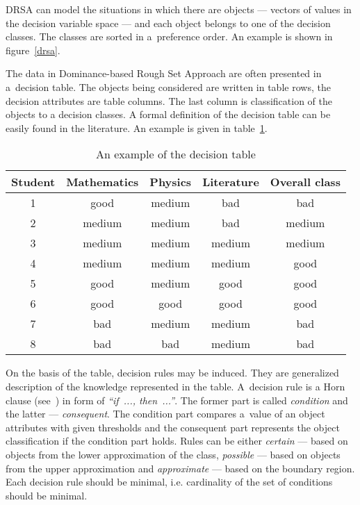 DRSA can model the situations in which there are objects --- vectors of values
in the decision variable space --- and each object belongs to one of the
decision classes. The classes are sorted in a~preference order. An example is
shown in figure~\ref{drsa}.

The data in Dominance-based Rough Set Approach are often presented in
a~decision table. The objects being considered are written in table rows, the
decision attributes are table columns. The last column is classification of
the objects to a decision classes. A formal definition of the decision table
can be easily found in the literature. An example is given in
table~\ref{t:dec_tab-example}.

\begin{table}
  \centering
  \begin{tabular}{c c c c | c}
   \hline
   Student & Mathematics & Physics & Literature & Overall class \\
   \hline
   \hline
   1 & good & medium & bad & bad \\
   2 & medium & medium & bad & medium \\
   3 & medium & medium & medium & medium \\
   4 & medium & medium & medium & good \\
   5 & good & medium & good & good \\
   6 & good & good & good & good \\
   7 & bad & medium & medium & bad \\
   8 & bad & bad & medium & bad \\
   \hline
  \end{tabular}
  \caption{An example of the decision table}
  \label{t:dec_tab-example}
\end{table}

On the basis of the table, decision rules may be induced. They are generalized
description of the knowledge represented in the table. A~decision rule is a
Horn clause (see~\cite{Hor51}) in form of \textit{``if~..., then~...''}. The
former part is called \textit{condition} and the latter ---
\textit{consequent}. The condition part compares a~value of an object
attributes with given thresholds and the consequent part represents the object
classification if the condition part holds. Rules can be either
\textit{certain} --- based on objects from the lower approximation of the
class, \textit{possible} --- based on objects from the upper approximation and
\textit{approximate} --- based on the boundary region. Each decision rule
should be minimal, i.e. cardinality of the set of conditions should be
minimal.

